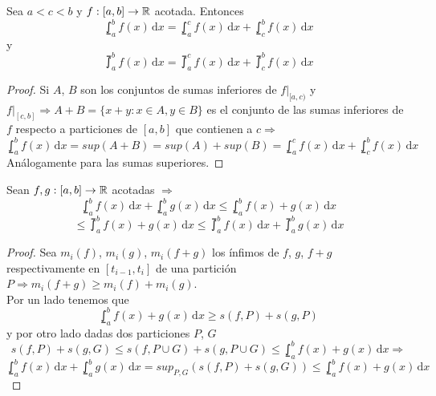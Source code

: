 \begin{theorem}
  Sea $a < c < b$ y $f: [a, b] \to \mathbb{R}$ acotada. Entonces \begin{equation}
    \lowint_a^b f(x)\,\mathrm{d}x = \lowint_a^c f(x)\,\mathrm{d}x + \lowint_c^b f(x)\,\mathrm{d}x
  \end{equation} y \begin{equation}
    \upint_a^b f(x)\, \mathrm{d}x = \upint_a^c f(x)\, \mathrm{d}x + \upint_c^b f(x)\, \mathrm{d}x
  \end{equation}

  \begin{proof}
    Si $A$, $B$ son los conjuntos de sumas inferiores de $f|_{[a, c)}$ y $f|_{[c, b]} \Rightarrow A + B = \{ x+y : x \in A, y \in B \}$ es el conjunto de las sumas inferiores de $f$ respecto a particiones
    de $[a, b]$ que contienen a $c \Rightarrow$ \begin{equation}
      \lowint_a^b f(x)\,\mathrm{d}x = sup(A+B) = sup(A) + sup(B) = \lowint_a^c f(x)\,\mathrm{d}x + \lowint_c^b f(x)\,\mathrm{d}x
    \end{equation}
    Análogamente para las sumas superiores.
  \end{proof}
\end{theorem}

\begin{prop}
  Sean $f, g: [a, b] \to \mathbb{R}$ acotadas $\Rightarrow$
  \begin{equation}
    \lowint_a^b f(x)\,\mathrm{d}x + \lowint_a^b g(x)\,\mathrm{d}x \leq \lowint_a^b f(x)+g(x)\,\mathrm{d}x
  \end{equation}
  \begin{equation}
    \leq \upint_a^b f(x) + g(x)\, \mathrm{d}x \leq \upint_a^b f(x)\, \mathrm{d}x + \upint_a^b g(x)\, \mathrm{d}x
  \end{equation}
  \begin{proof}
    Sea $m_i(f)$, $m_i(g)$, $m_i(f+g)$ los ínfimos de $f$, $g$, $f+g$ respectivamente en $[t_{i-1}, t_i]$ de una partición $P \Rightarrow m_i(f+g) \geq m_i(f) + m_i(g)$. \\
    Por un lado tenemos que \begin{equation}
      \lowint_a^b f(x)+g(x)\, \mathrm{d}x \geq s(f, P) + s(g, P)
    \end{equation} y por otro lado dadas dos particiones $P$, $G$ \begin{equation}
      s(f, P) + s(g, G) \leq s(f, P \cup G) + s(g, P \cup G) \leq \lowint_a^b f(x)+g(x)\,\mathrm{d}x \Rightarrow
    \end{equation}
    \begin{equation}
      \lowint_a^b f(x) \, \mathrm{d}x + \lowint_a^b g(x) \, \mathrm{d}x = sup_{P, G}(s(f, P)+s(g, G)) \leq \lowint_a^b f(x) + g(x)\, \mathrm{d}x
    \end{equation}
  \end{proof}
\end{prop}

